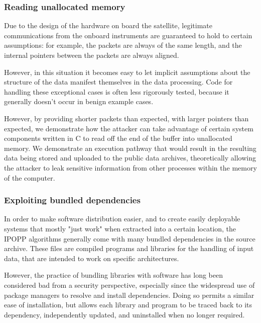 
\subsubsection{Reading unallocated memory}

Due to the design of the hardware on board the satellite, legitimate communications from the onboard instruments are guaranteed to hold to certain assumptions: for example, the packets are always of the same length, and the internal pointers between the packets are always aligned.

However, in this situation it becomes easy to let implicit assumptions about the structure of the data manifest themselves in the data processing.
Code for handling these exceptional cases is often less rigorously tested, because it generally doesn't occur in benign example cases.

However, by providing shorter packets than expected, with larger pointers than expected, we demonstrate how the attacker can take advantage of certain system components written in C to read off the end of the buffer into unallocated memory.
We demonstrate an execution pathway that would result in the resulting data being stored and uploaded to the public data archives, theoretically allowing the attacker to leak sensitive information from other processes within the memory of the computer.


\subsubsection{Exploiting bundled dependencies}

In order to make software distribution easier, and to create easily deployable systems that mostly "just work" when extracted into a certain location, the IPOPP algorithms generally come with many bundled dependencies in the source archive.
These files are compiled programs and libraries for the handling of input data, that are intended to work on specific architectures.

However, the practice of bundling libraries with software has long been considered bad from a security perspective, especially since the widespread use of package managers to resolve and install dependencies.
Doing so permits a similar ease of installation, but allows each library and program to be traced back to its dependency, independently updated, and uninstalled when no longer required.

